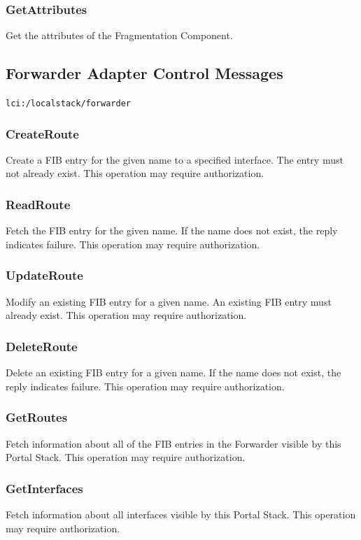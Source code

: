 \subsubsection{GetAttributes}
Get the attributes of the Fragmentation Component.

\subsection{Forwarder Adapter Control Messages}
{\tt lci:/localstack/forwarder}

\subsubsection{CreateRoute}
Create a FIB entry for the given name to a specified interface.
The entry must not already exist.
This operation may require authorization.

\subsubsection{ReadRoute}
Fetch the FIB entry for the given name.
If the name does not exist, the reply indicates failure.
This operation may require authorization.

\subsubsection{UpdateRoute}
Modify an existing FIB entry for a given name.
An existing FIB entry must already exist.
This operation may require authorization.

\subsubsection{DeleteRoute}
Delete an existing FIB entry for a given name.
If the name does not exist, the reply indicates failure.
This operation may require authorization.

\subsubsection{GetRoutes}
Fetch information about all of the FIB entries in the Forwarder visible by this Portal Stack.
This operation may require authorization.

\subsubsection{GetInterfaces}
Fetch information about all interfaces visible by this Portal Stack.
This operation may require authorization.

